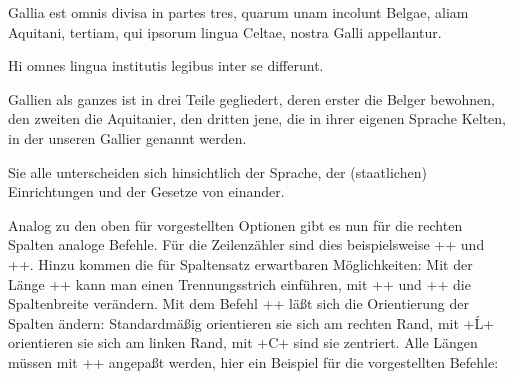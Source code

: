 \begin{lfgwprint}{}
\begin{pairs}
\begin{Leftside}
\beginnumbering
\autopar
{}

Gallia est omnis divisa in partes tres, 
    quarum unam incolunt Belgae,
    aliam Aquitani,
    tertiam, qui ipsorum lingua Celtae, nostra Galli appellantur.

Hi omnes lingua institutis legibus inter se differunt.

\endnumbering
\end{Leftside}

\begin{Rightside}
\beginnumbering
\autopar

Gallien als ganzes ist in drei Teile gegliedert,
    deren erster die Belger bewohnen,
    den zweiten die Aquitanier,
    den dritten jene, die in ihrer eigenen Sprache Kelten, in der unseren Gallier genannt werden.

Sie alle unterscheiden sich hinsichtlich der Sprache, 
    der (staatlichen) Einrichtungen und der Gesetze von einander.
    
\endnumbering
\end{Rightside}
\end{pairs}

\Columns
\end{lfgwprint}

Analog zu den oben für \reledmac vorgestellten Optionen gibt es nun für die rechten Spalten analoge Befehle. Für die Zeilenzähler sind dies beispielsweise ++ und ++. Hinzu kommen die für Spaltensatz erwartbaren Möglichkeiten: Mit der Länge +\columnrulewidth+ kann man einen Trennungsstrich einführen, mit +\Lcolwidth+ und +\Rcolwidth+ die Spaltenbreite verändern. Mit dem Befehl ++ läßt sich die Orientierung der Spalten ändern: Standardmäßig orientieren sie sich am rechten Rand, mit +Ĺ+ orientieren sie sich am linken Rand, mit +C+ sind sie zentriert. Alle Längen müssen mit +\setlength{<name>}{<laenge>}+ angepaßt werden, hier ein Beispiel für die vorgestellten Befehle: 

\begin{lfgwcode}{}
\setlength{\columnrulewidth}{0.5pt}
\setlength{\Lcolwidth}{0.425\textwidth}
\setlength{\Rcolwidth}{0.425\textwidth}
\end{lfgwcode}


